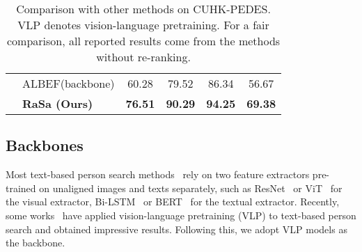 \documentclass{article}
\begin{document}
\begin{table}[t]
\begin{tabular}{c|l|cccc}
\cline{2-6}
                                               & ALBEF(backbone) \cite{NEURIPS2021_50525975}& 60.28     & 79.52      & 86.34      & 56.67           \\
                                               & \textbf{RaSa (Ours)}        & \textbf{76.51}    & \textbf{90.29}    & \textbf{94.25}    & \textbf{69.38} \\
\hline
\end{tabular}
\caption{Comparison with other methods on CUHK-PEDES. VLP denotes vision-language pretraining. For a fair comparison, all reported results come from the methods without re-ranking.}
\label{table1}
\end{table}


\iffalse
\subsection{Implementation Details}
All experiments are conducted on  NVIDIA  GPUs.
We train our model with  epochs and a batch size of . 
The AdamW optimizer~\cite{loshchilov2018decoupled} is adopted with a weight decay of . 
The learning rate is initialized as  for the parameters of the classifiers in PRD and -RTD, and  for the rest parameters of the model.
All images are resized to  and random horizontal flipping is employed for data augmentation.
The input texts are set with a maximum length of  for all datasets.
The momentum coefficient in the momentum model is set as .
The queue size  is set as  and the temperature  is set as  in CL.
The probability of inputting the weak positive pair is set as  in RA, and the probability of masking the word in the text is set as  in SA.
The hyper-parameters in the objective function are set as , , .  
\fi

\subsection{Backbones}
\label{Baselines}




Most text-based person search methods~\cite{li2022learning,shao2022learning} rely on two feature extractors pre-trained on unaligned images and texts separately, such as ResNet~\cite{he2016deep} or ViT~\cite{dosovitskiy2020image} for the visual extractor, Bi-LSTM~\cite{hochreiter1997long} or BERT~\cite{devlin2018bert} for the textual extractor. 
Recently, some works~\cite{shu2022see,yan2022clip} have applied vision-language pretraining (VLP) to text-based person search and obtained impressive results. 
Following this, we adopt VLP models as the backbone.
\end{document}
